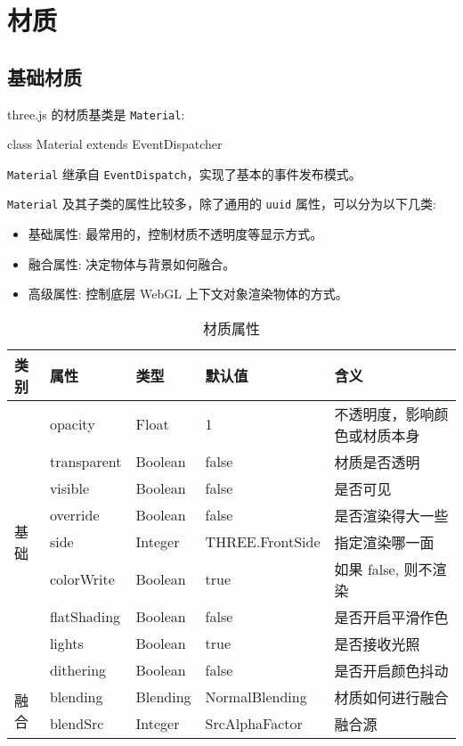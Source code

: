 \section{材质}
\subsection{基础材质}

three.js 的材质基类是 \texttt{Material}:

\begin{JavaScript}
class Material extends EventDispatcher
\end{JavaScript}

\texttt{Material} 继承自 \texttt{EventDispatch}，实现了基本的事件发布模式。

\texttt{Material} 及其子类的属性比较多，除了通用的 \texttt{uuid} 属性，可以分为以下几类:
\begin{itemize}
  \item 基础属性: 最常用的，控制材质不透明度等显示方式。
  \item 融合属性: 决定物体与背景如何融合。
  \item 高级属性: 控制底层 WebGL 上下文对象渲染物体的方式。
\end{itemize}

\begin{table}[H]
  \centering
  \small
  \caption{材质属性}
  \label{table:材质属性}
  \setlength{\tabcolsep}{4mm}
  \begin{tabular}{l|l|l|l|l}
    \toprule
    \textbf{类别} & \textbf{属性} & \textbf{类型} & \textbf{默认值} & \textbf{含义} \\
    \midrule
    \multirow{9}{*}{基础} & opacity & Float & 1 & 不透明度，影响颜色或材质本身 \\
     & transparent & Boolean & false & 材质是否透明 \\
     & visible & Boolean & false & 是否可见 \\
     & override & Boolean & false & 是否渲染得大一些 \\
     & side & Integer & THREE.FrontSide & 指定渲染哪一面 \\
     & colorWrite & Boolean & true & 如果 false, 则不渲染 \\
     & flatShading & Boolean & false & 是否开启平滑作色 \\
     & lights & Boolean & true & 是否接收光照 \\
     & dithering & Boolean & false & 是否开启颜色抖动 \\
    \midrule
    \multirow{2}{*}{融合} & blending & Blending & NormalBlending &  材质如何进行融合 \\
     & blendSrc & Integer & SrcAlphaFactor & 融合源 \\
    \bottomrule
  \end{tabular}
\end{table}


